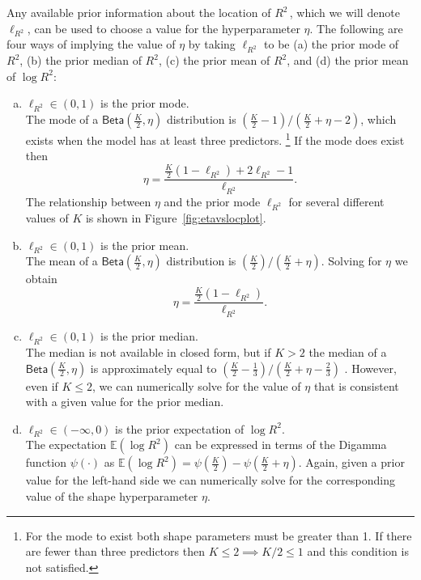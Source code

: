\documentclass[11pt]{article}
\newcommand{\Rsq}{$R^2\,$}
\newcommand{\locRsq}{\ell_{R^2}}
\newcommand{\halfK}{\frac{K}{2}}
\newcommand{\Betadist}[2]{\mathsf{Beta}\left(#1,#2\right)}
\newcommand{\Digamma}[1]{\psi\left(#1\right)}
\begin{document}
Any available prior information about the location of \Rsq, which we will denote
$\locRsq$, can be used to choose a value for the hyperparameter $\eta$. The
following are four ways of implying the value of $\eta$ by taking $\locRsq$ to
be (a) the prior mode of $R^2$, (b) the prior median of $R^2$, (c) the prior
mean of $R^2$, and (d) the prior mean of $\log{R^2}$:


\begin{enumerate}[(a)]
\item $\locRsq \in \left(0,1\right)$ is the prior mode. \\[5pt]
%
The mode of a $\Betadist{\halfK}{\eta}$ distribution is
$\left(\halfK - 1\right) / \left(\halfK + \eta - 2\right)$, which exists when
the model has at least three predictors.%
\footnote{For the mode to exist both shape parameters must be greater than 1. If
there are fewer than three predictors then $K \leq 2 \implies K/2 \leq 1$ and
this condition is not satisfied.}
If the mode does exist then
%
$$\eta = \frac{\halfK \left(1 - \locRsq\right) + 2\locRsq - 1}{\locRsq}.$$
%
The relationship between $\eta$ and the prior mode $\locRsq$ for
several different values of $K$ is shown in Figure~\ref{fig:etavslocplot}.

\item $\locRsq \in \left(0,1\right)$ is the prior mean. \\[5pt]
%
The mean of a $\Betadist{\halfK}{\eta}$ distribution is
$\left(\halfK\right) / \left(\halfK + \eta\right)$. Solving for $\eta$ we obtain
%
$$\eta = \frac{\halfK \left(1 - \locRsq \right)}{\locRsq}.$$

\item $\locRsq \in \left(0,1\right)$ is the prior median. \\[5pt]
%
The median is not available in closed form, but if $K > 2$ the median of a
$\Betadist{\halfK}{\eta}$ is approximately equal to
$\left(\halfK - \frac{1}{3}\right) / \left(\halfK + \eta - \frac{2}{3}\right)$
\cite{kerman}. However, even if $K \leq 2$, we can numerically solve for the
value of $\eta$ that is consistent with a given value for the prior median.

\item $\locRsq \in \left(-\infty,0\right)$ is the prior expectation of
$\log{R^2}$. \\[5pt]
%
The expectation $\mathbb{E}\left(\log{R^2}\right)$ can be expressed in terms of
the Digamma function $\Digamma{\cdot}$ as
$\mathbb{E}\left(\log{R^2}\right) = \Digamma{\halfK} - \Digamma{\halfK + \eta}$.
Again, given a prior value for the left-hand side we can numerically solve for
the corresponding value of the shape hyperparameter $\eta$.
\end{enumerate}
\end{document}
